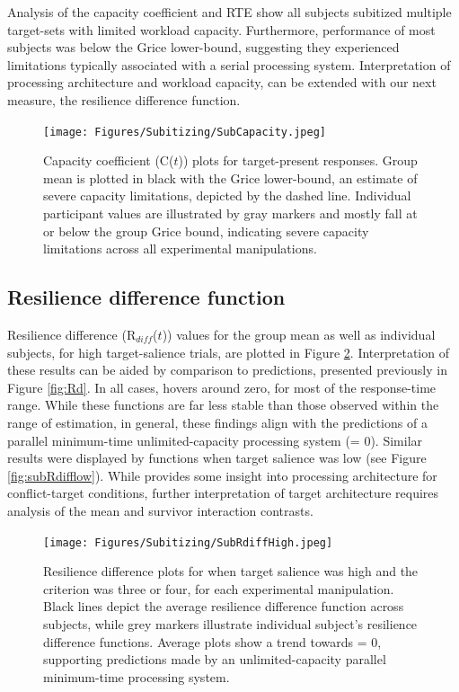 Analysis of the capacity coefficient and RTE show all subjects subitized multiple target-sets with limited workload capacity. Furthermore, performance of most subjects was below the Grice lower-bound, suggesting they experienced limitations typically associated with a serial processing system. Interpretation of processing architecture and workload capacity, can be extended with our next measure, the resilience difference function. 

\begin{figure}[hbt]
\centering \texttt{[image: Figures/Subitizing/SubCapacity.jpeg]}
\caption{Capacity coefficient (C($t$)) plots for target-present responses. Group mean \Ct is plotted in black with the Grice lower-bound, an estimate of severe capacity limitations, depicted by the dashed line. Individual participant \Ct values are illustrated by gray markers and mostly fall at or below the group Grice bound, indicating severe capacity limitations across all experimental manipulations.}
\label{fig:subCap}
\end{figure}

\subsection{Resilience difference function}
Resilience difference (R$_{diff}$($t$)) values for the group mean as well as individual subjects, for high target-salience trials, are plotted in Figure \ref{fig:subRdiffHigh}. Interpretation of these results can be aided by comparison to \Rd predictions, presented previously in Figure \ref{fig:Rd}. In all cases, \Rd hovers around zero, for most of the response-time range. While these \Rd functions are far less stable than those observed within the range of estimation, in general, these findings align with the predictions of a parallel minimum-time unlimited-capacity processing system (\Rd = 0). Similar results were displayed by \Rd functions when target salience was low (see Figure \ref{fig:subRdifflow}). While \Rd provides some insight into processing architecture for conflict-target conditions, further interpretation of target architecture requires analysis of the mean and survivor interaction contrasts.

\begin{figure}[hbt]
\centering \texttt{[image: Figures/Subitizing/SubRdiffHigh.jpeg]}
\caption{Resilience difference plots for when target salience was high and the criterion was three or four, for each experimental manipulation. Black lines depict the average resilience difference function across subjects, while grey markers illustrate individual subject’s resilience difference functions. Average plots show a trend towards \Rd = 0, supporting predictions made by an unlimited-capacity parallel minimum-time processing system.}
\label{fig:subRdiffHigh}
\end{figure}

